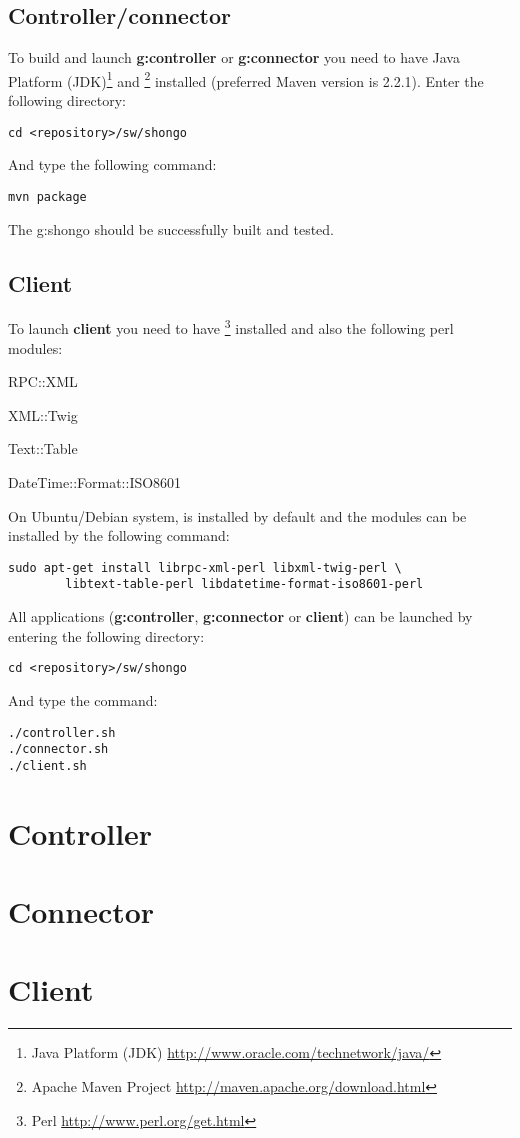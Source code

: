 \subsection{Controller/connector}
To build and launch \textbf{\gls{g:controller}} or \textbf{\gls{g:connector}} you need to have Java Platform (JDK)\footnote{Java Platform (JDK) \url{http://www.oracle.com/technetwork/java/}} and \footnote{Apache Maven Project \url{http://maven.apache.org/download.html}} installed (preferred Maven version is 2.2.1). Enter the following directory:
\begin{verbatim}
cd <repository>/sw/shongo
\end{verbatim}
And type the following command:
\begin{verbatim}
mvn package
\end{verbatim}
The \gls{g:shongo} should be successfully built and tested. 

\subsection{Client}
To launch \textbf{client} you need to have \footnote{Perl \url{http://www.perl.org/get.html}} installed and also the following perl modules:
\begin{compactenum}
\item RPC::XML
\item XML::Twig
\item Text::Table
\item DateTime::Format::ISO8601
\end{compactenum}
On Ubuntu/Debian system,  is installed by default and the modules
can be installed by the following command:
\begin{verbatim}
sudo apt-get install librpc-xml-perl libxml-twig-perl \
        libtext-table-perl libdatetime-format-iso8601-perl
\end{verbatim}
All applications (\textbf{\gls{g:controller}}, \textbf{\gls{g:connector}} or \textbf{client}) can be launched by entering the following directory:
\begin{verbatim}
cd <repository>/sw/shongo
\end{verbatim}
And type the  command:
\begin{verbatim}
./controller.sh
./connector.sh
./client.sh
\end{verbatim}

\section{Controller}

\section{Connector}

\section{Client}

